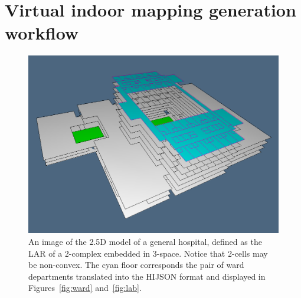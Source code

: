 \section{Virtual indoor mapping generation workflow}\label{workflow}

\begin{figure}[ptb] %
 \centering
 \includegraphics[width=\linewidth]{images/hospital2} 
 \caption{An image of the 2.5D model of a general hospital, defined as the LAR of a 2-complex embedded in 3-space. Notice that 2-cells may be non-convex. The cyan floor corresponds the pair of ward departments translated into the HIJSON format and displayed in Figures~\ref{fig:ward} and~\ref{fig:lab}.}
 \label{fig:hospital2}
\end{figure}


